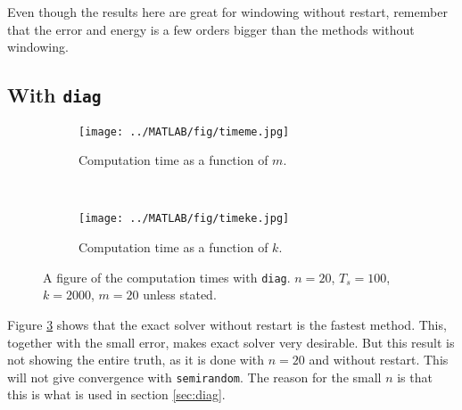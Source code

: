 \noindent Even though the results here are great for windowing without restart, remember that the error and energy is a few orders bigger than the methods without windowing.
\subsection{With \texttt{diag}}
\begin{figure}[H]
        \centering
        \begin{subfigure}[b]{0.3\textwidth}
                \texttt{[image: ../MATLAB/fig/timeme.jpg]}
                \caption{ Computation time as a function of $m$. }
                \label{fig:timeme}
        \end{subfigure}
        ~
        \begin{subfigure}[b]{0.3\textwidth}
                \texttt{[image: ../MATLAB/fig/timeke.jpg]}
                \caption{ Computation time as a function of $k$. }
                \label{fig:timeke}
        \end{subfigure}
        \caption{ A figure of the computation times with \texttt{diag}. $n = 20$, $T_s = 100$, $k = 2000$, $m = 20$ unless stated. }
        \label{fig:time3}
\end{figure}
Figure \ref{fig:time3} shows that the exact solver without restart is the fastest method. This, together with the small error, makes exact solver very desirable. But this result is not showing the entire truth, as it is done with $n = 20$ and without restart. This will not give convergence with \texttt{semirandom}. The reason for the small $n$ is that this is what is used in section \ref{sec:diag}. 